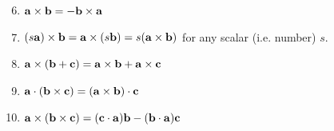\addtocounter{theorem}{-1}
\begin{theorem}[continued]
\begin{enumerate}[(1)]
\setcounter{enumi}{5}

\item $\va\times \vb=-\vb\times\va$

\item $(s\va)\times \vb=\va\times(s\vb)=s(\va\times \vb)$ for any scalar
(i.e. number) $s$.

\item $\va\times(\vb+\vc)=\va\times\vb+\va\times \vc$

\item $\va\cdot(\vb\times\vc)=(\va\times\vb)\cdot\vc$

\item $\va\times(\vb\times\vc)=(\vc\cdot\va)\vb -(\vb\cdot\va)\vc$
\end{enumerate}

\end{theorem}
